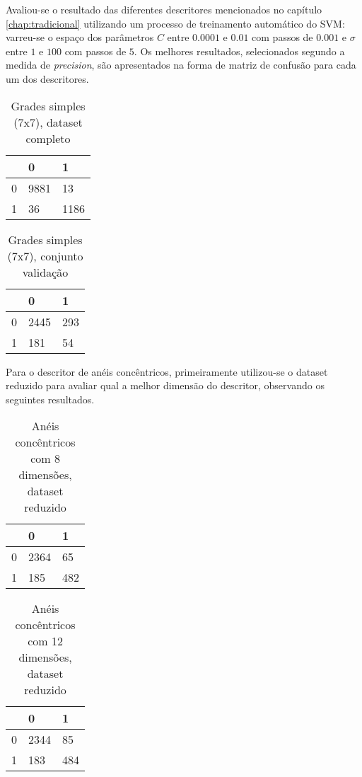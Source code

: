 Avaliou-se o resultado das diferentes descritores mencionados no capítulo \ref{chap:tradicional} utilizando um processo de treinamento automático do SVM: varreu-se o espaço dos parâmetros $C$ entre $0.0001$ e $0.01$ com passos de $0.001$ e $\sigma$ entre $1$ e $100$ com passos de $5$. Os melhores resultados, selecionados segundo a medida de \textit{precision}, são apresentados na forma de matriz de confusão para cada um dos descritores.

\begin{table}[h]
\centering
\caption{Grades simples (7x7), dataset completo}
\begin{tabular}{l|l|l|}
\cline{2-3}
                        & 0 & 1 \\ \hline
\multicolumn{1}{|l|}{0} & 9881 & 13 \\ \hline
\multicolumn{1}{|l|}{1} & 36   & 1186 \\ \hline
\end{tabular}
\end{table}

\begin{table}[h]
\centering
\caption{Grades simples (7x7), conjunto validação}
\begin{tabular}{l|l|l|}
\cline{2-3}
                        & 0 & 1 \\ \hline
\multicolumn{1}{|l|}{0} & 2445 & 293 \\ \hline
\multicolumn{1}{|l|}{1} & 181  & 54 \\ \hline
\end{tabular}
\end{table}

Para o descritor de anéis concêntricos, primeiramente utilizou-se o dataset reduzido para avaliar qual a melhor dimensão do descritor, observando os seguintes resultados.

\begin{table}[h]
\centering
\caption{Anéis concêntricos com 8 dimensões, dataset reduzido}
\begin{tabular}{l|l|l|}
\cline{2-3}
                        & 0 & 1 \\ \hline
\multicolumn{1}{|l|}{0} & 2364 & 65 \\ \hline
\multicolumn{1}{|l|}{1} & 185 & 482 \\ \hline
\end{tabular}
\end{table}

\begin{table}[h]
\centering
\caption{Anéis concêntricos com 12 dimensões, dataset reduzido}
\begin{tabular}{l|l|l|}
\cline{2-3}
                        & 0 & 1 \\ \hline
\multicolumn{1}{|l|}{0} & 2344 & 85 \\ \hline
\multicolumn{1}{|l|}{1} & 183 & 484 \\ \hline
\end{tabular}
\end{table}

